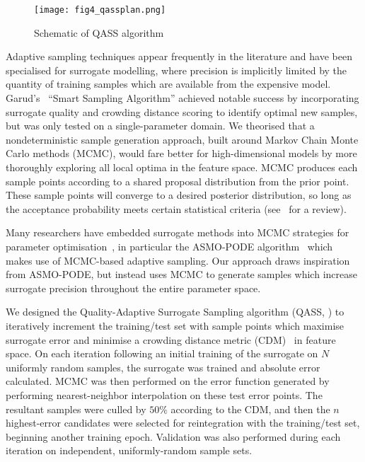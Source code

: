 \begin{figure}
	\centering
	\texttt{[image: fig4\_qassplan.png]}
	\caption{\label{fig:qassplan}Schematic of QASS algorithm}
\end{figure}

Adaptive sampling techniques appear frequently in the literature and have been specialised for surrogate modelling, where precision is implicitly limited by the quantity of training samples which are available from the expensive model. Garud's~\cite{Garud2016} ``Smart Sampling Algorithm'' achieved notable success by incorporating surrogate quality and
crowding distance scoring to identify optimal new samples, but was only tested
on a single-parameter domain. We theorised that a nondeterministic sample
generation approach, built around Markov Chain Monte Carlo methods (MCMC), would
fare better for high-dimensional models by more thoroughly exploring all local
optima in the feature space. MCMC produces each sample points according to a shared proposal
distribution from the prior point. These sample points will converge to a desired posterior
distribution, so long as the acceptance probability meets certain statistical criteria (see~\cite{Zhou2018} for a review).

Many researchers have embedded surrogate methods into MCMC strategies for
parameter optimisation~\cite{Zhang2020,Gong2017}, in particular the ASMO-PODE
algorithm~\cite{Ginting2011} which makes use of MCMC-based adaptive sampling. Our approach draws inspiration from ASMO-PODE, but instead uses MCMC to generate samples
which increase surrogate precision throughout the entire parameter space.

We designed the Quality-Adaptive Surrogate Sampling algorithm (QASS, ) to iteratively increment the training/test set with sample
points which maximise surrogate error and minimise a crowding distance metric
(CDM)~\cite{Solonen2012} in feature space. On each iteration following an initial training of the surrogate on $N$ uniformly random samples, the surrogate was trained and absolute error calculated. MCMC was then performed on the error function generated by performing nearest-neighbor interpolation on these test error points. The resultant samples were culled by $50\%$ according to the CDM, and then the $n$ highest-error candidates were selected for reintegration with the training/test set, beginning another training epoch. Validation was also performed during each iteration on independent, uniformly-random sample sets.
